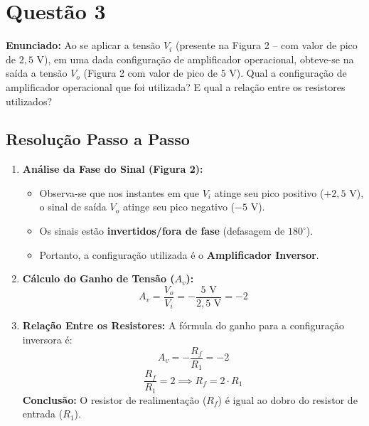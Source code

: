 \section*{Questão 3}
\textbf{Enunciado:} Ao se aplicar a tensão $V_i$ (presente na Figura 2 -- com valor de pico de $2{,}5\text{ V}$), em uma dada configuração de amplificador operacional, obteve-se na saída a tensão $V_o$ (Figura 2 com valor de pico de $5\text{ V}$). Qual a configuração de amplificador operacional que foi utilizada? E qual a relação entre os resistores utilizados?

\subsection*{Resolução Passo a Passo}
\begin{enumerate}
    \item \textbf{Análise da Fase do Sinal (Figura 2):}
    \begin{itemize}
        \item Observa-se que nos instantes em que $V_i$ atinge seu pico positivo ($+2{,}5\text{ V}$), o sinal de saída $V_o$ atinge seu pico negativo ($-5\text{ V}$).
        \item Os sinais estão \textbf{invertidos/fora de fase} (defasagem de $180^\circ$).
        \item Portanto, a configuração utilizada é o \textbf{Amplificador Inversor}.
    \end{itemize}

    \item \textbf{Cálculo do Ganho de Tensão ($A_v$):}
    \begin{equation*}
        A_v = \frac{V_o}{V_i} = -\frac{5\text{ V}}{2{,}5\text{ V}} = -2
    \end{equation*}

    \item \textbf{Relação Entre os Resistores:}
    A fórmula do ganho para a configuração inversora é:
    \begin{equation*}
        A_v = -\frac{R_f}{R_1} = -2
    \end{equation*}
    \begin{equation*}
        \frac{R_f}{R_1} = 2 \implies R_f = 2 \cdot R_1
    \end{equation*}
    \textbf{Conclusão:} O resistor de realimentação ($R_f$) é igual ao dobro do resistor de entrada ($R_1$).
\end{enumerate}

\newpage

